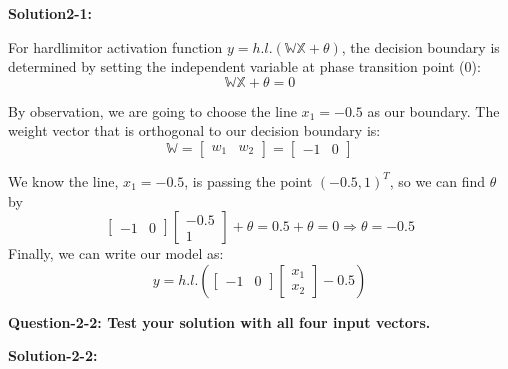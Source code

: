 \documentclass[12pt,letterpaper]{article}
\theoremstyle{definition}
\begin{document}

\textbf{Solution2-1:}

For hardlimitor activation function $y=h.l.(\mathbb{W}\mathbb{X}+\theta)$, the decision boundary is determined by setting the independent variable at phase transition point (0):
\begin{equation}
    \mathbb{W}\mathbb{X} + \theta  = 0\label{eq2-1-1}
\end{equation}

By observation, we are going to choose the line $x_1=-0.5$ as our boundary. The weight vector that is orthogonal to our decision boundary is:
\[\mathbb{W} = \left[ {\begin{array}{*{20}{c}}
{{w_1}}&{{w_2}}
\end{array}} \right] = \left[ {\begin{array}{*{20}{c}}
-1&0
\end{array}} \right]\]


We know the line, $x_1=-0.5$, is passing the point $(-0.5, 1)^T$, so we can find $\theta$ by
\[\left[ {\begin{array}{*{20}{c}}
-1&0
\end{array}} \right]\left[ {\begin{array}{*{20}{c}}
{ - 0.5}\\
1
\end{array}} \right] + \theta  =  0.5  + \theta  = 0 \Rightarrow \theta  = -0.5\]
Finally, we can write our model as:
\begin{equation}
    \boxed{y = h.l.\left( {\left[ {\begin{array}{*{20}{c}}
-1&0
\end{array}} \right]\left[ {\begin{array}{*{20}{c}}
{{x_1}}\\
{{x_2}}
\end{array}} \right] - 0.5} \right)}
\end{equation}

\textbf{Question-2-2: Test your solution with all four input vectors.}

\textbf{Solution-2-2:}
\end{document}
